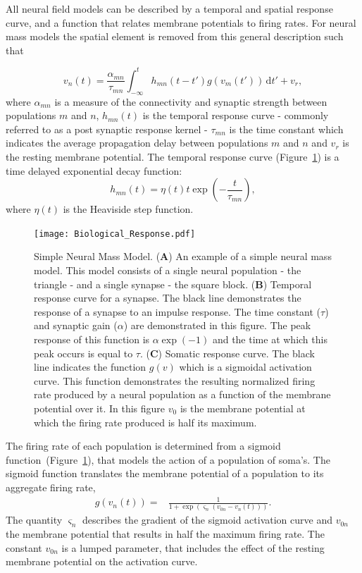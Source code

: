 All neural field models can be described by a temporal and spatial response curve, and a function that relates membrane potentials to firing rates. For neural mass models the spatial element is removed from this general description such that

\begin{equation}\label{eq:conv_eq}
    v_n(t) = \frac{\alpha_{mn}}{\tau_{mn}}\int_{-\infty}^t  h_{mn}(t-t')g(v_m(t')) \,\mathrm{d}t' + v_r,
\end{equation}
where $\alpha_{mn}$ is a measure of the connectivity and synaptic strength between populations $m$ and $n$, $h_{mn}(t)$ is the temporal response curve - commonly referred to as a post synaptic response kernel - $\tau_{mn}$ is the time constant which indicates the average propagation delay between populations $m$ and $n$ and $v_r$ is the resting membrane potential. The temporal response curve (Figure~\ref{fig: Simple}) is a time delayed exponential decay function:
\begin{equation}
    h_{mn}(t) = \eta(t)t\exp\left(-\frac{t}{\tau_{mn}}\right),
\end{equation}
where $\eta(t)$ is the Heaviside step function. 

\begin{figure}
	\centering
		\texttt{[image: Biological\_Response.pdf]}
	\caption{Simple Neural Mass Model. (\textbf{A}) An example of a simple neural mass model. This model consists of a single neural population - the triangle - and a single synapse - the square block. (\textbf{B}) Temporal response curve for a synapse. The black line demonstrates the response of a synapse to an impulse response. The time constant ($\tau$) and synaptic gain ($\alpha$) are demonstrated in this figure. The peak response of this function is $\alpha \exp(-1)$ and the time at which this peak occurs is equal to $\tau$. (\textbf{C}) Somatic response curve. The black line indicates the function $g(v)$ which is a sigmoidal activation curve. This function demonstrates the resulting normalized firing rate produced by a neural population as a function of the membrane potential over it. In this figure $v_{0}$ is the membrane potential at which the firing rate produced is half its maximum.}
	\label{fig: Simple}
\end{figure}

The firing rate of each population is determined from a sigmoid function~(Figure~\ref{fig: Simple}), that models the action of a population of soma's. The sigmoid function translates the membrane potential of a population to its aggregate firing rate,
\begin{align}\label{eq:sigmoid}
    g\left(v_n(t)\right) =& \frac{1}{1+\exp{\left(\varsigma_n\left(v_{0n} - v_n(t)\right)\right)}}.
\end{align}
The quantity $\varsigma_n$ describes the gradient of the sigmoid activation curve and $v_{0n}$ the membrane potential that results in half the maximum firing rate. The constant $v_{0n}$ is a lumped parameter, that includes the effect of the resting membrane potential on the activation curve. 

